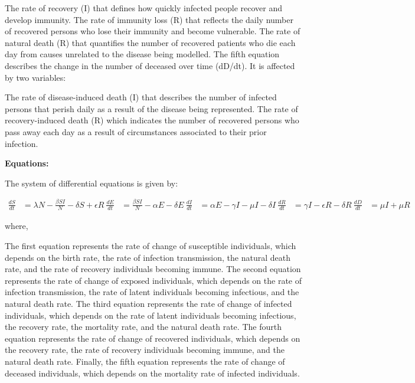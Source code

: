 \documentclass{article}
\begin{document}
The rate of recovery (I) that defines how quickly infected people recover and develop immunity.
The rate of immunity loss (R) that reflects the daily number of recovered persons who lose their immunity and become vulnerable.
The rate of natural death (R) that quantifies the number of recovered patients who die each day from causes unrelated to the disease being modelled.
The fifth equation describes the change in the number of deceased over time (dD/dt). It is affected by two variables:

The rate of disease-induced death (I) that describes the number of infected persons that perish daily as a result of the disease being represented.
The rate of recovery-induced death (R) which indicates the number of recovered persons who pass away each day as a result of circumstances associated to their prior infection.


\textbf{Equations:}

The system of differential equations is given by:

\begin{align*}
    \frac{dS}{dt} &= \lambda N - \frac{\beta S I}{N} - \delta S + \epsilon R \
    \frac{dE}{dt} &= \frac{\beta S I}{N} - \alpha E - \delta E \
    \frac{dI}{dt} &= \alpha E - \gamma I - \mu I - \delta I \
    \frac{dR}{dt} &= \gamma I - \epsilon R - \delta R \
    \frac{dD}{dt} &= \mu I + \mu R
\end{align*}

where,



The first equation represents the rate of change of susceptible individuals, which depends on the birth rate, the rate of infection transmission, the natural death rate, and the rate of recovery individuals becoming immune. The second equation represents the rate of change of exposed individuals, which depends on the rate of infection transmission, the rate of latent individuals becoming infectious, and the natural death rate. The third equation represents the rate of change of infected individuals, which depends on the rate of latent individuals becoming infectious, the recovery rate, the mortality rate, and the natural death rate. The fourth equation represents the rate of change of recovered individuals, which depends on the recovery rate, the rate of recovery individuals becoming immune, and the natural death rate. Finally, the fifth equation represents the rate of change of deceased individuals, which depends on the mortality rate of infected individuals.
\end{document}
